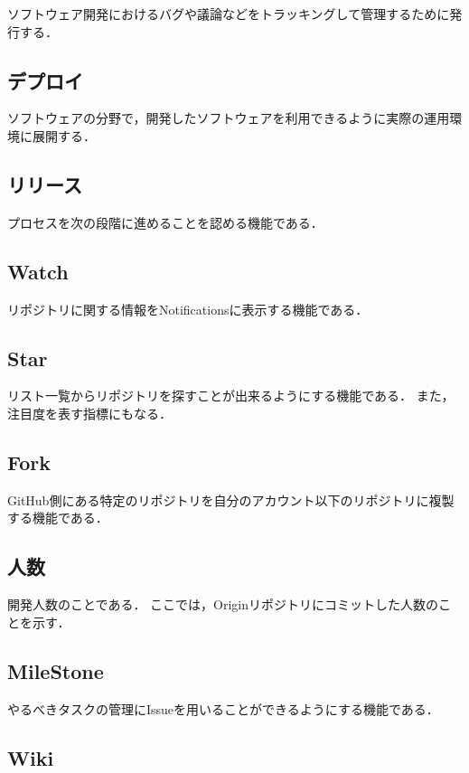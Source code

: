 ソフトウェア開発におけるバグや議論などをトラッキングして管理するために発行する．

\subsection{デプロイ}

ソフトウェアの分野で，開発したソフトウェアを利用できるように実際の運用環境に展開する．


\subsection{リリース}

プロセスを次の段階に進めることを認める機能である．


\subsection{Watch}

リポジトリに関する情報をNotificationsに表示する機能である．

\subsection{Star}

リスト一覧からリポジトリを探すことが出来るようにする機能である．
また，注目度を表す指標にもなる．

\subsection{Fork}

GitHub側にある特定のリポジトリを自分のアカウント以下のリポジトリに複製する機能である．

\subsection{人数}
開発人数のことである．
ここでは，Originリポジトリにコミットした人数のことを示す．

\subsection{MileStone}

やるべきタスクの管理にIssueを用いることができるようにする機能である．

\subsection{Wiki}

